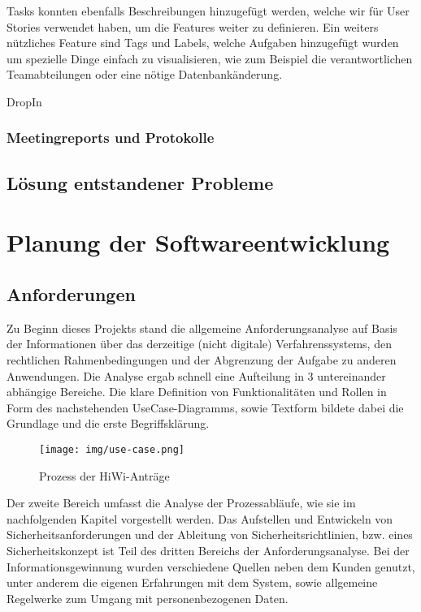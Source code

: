 \documentclass[12pt,a4paper]{scrartcl}
\begin{document}
Tasks konnten ebenfalls Beschreibungen hinzugefügt werden, welche wir für User Stories verwendet haben, um die Features weiter zu definieren.
Ein weiters nützliches Feature sind Tags und Labels, welche Aufgaben hinzugefügt wurden um spezielle Dinge einfach zu visualisieren, wie zum Beispiel die verantwortlichen Teamabteilungen oder eine nötige Datenbankänderung.

DropIn


\subsubsection{Meetingreports und Protokolle}
\label{reports}
\subsection{Lösung entstandener Probleme}

\section{Planung der Softwareentwicklung}

\subsection{Anforderungen}
\label{requirements}

Zu Beginn dieses Projekts stand die allgemeine Anforderungsanalyse auf Basis der Informationen über das derzeitige (nicht digitale) Verfahrenssystems, den rechtlichen Rahmenbedingungen und der 
 Abgrenzung der Aufgabe zu anderen Anwendungen. Die Analyse ergab schnell eine Aufteilung in 3 untereinander abhängige Bereiche. Die klare Definition von Funktionalitäten und Rollen in Form des nachstehenden UseCase-Diagramms, sowie Textform bildete dabei die Grundlage und die erste Begriffsklärung.

\begin{figure}[H]
	\centering
	\texttt{[image: img/use-case.png]}
	\caption{Prozess der HiWi-Anträge}
	\label{fig:use-case}
\end{figure}

Der zweite Bereich umfasst die Analyse der Prozessabläufe, wie sie im nachfolgenden Kapitel vorgestellt werden. Das Aufstellen und Entwickeln von Sicherheitsanforderungen und der Ableitung von Sicherheitsrichtlinien, bzw. eines Sicherheitskonzept ist Teil des dritten Bereichs der Anforderungsanalyse. Bei der Informationsgewinnung wurden verschiedene Quellen neben dem Kunden genutzt, unter anderem die eigenen Erfahrungen mit dem System, sowie allgemeine Regelwerke zum Umgang mit personenbezogenen Daten.
\end{document}
